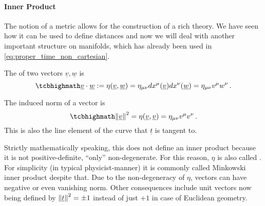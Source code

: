\documentclass[ART_main.tex]{subfiles}
\begin{document}
			\paragraph{Inner Product}
The notion of a metric allows for the construction of a rich theory. We have seen how it can be used to define distances and now we will deal with another important structure on manifolds, which has already been used in \eqref{eq:proper_time_non_cartesian}.

\begin{defi}
The  of two vectors $\underline{v}, \underline{w}$ is
\begin{equation}\label{eq:inner_prod}
	\eqbox{
	\underline{v} \cdot \underline{w} := \eta(\underline{v}, \underline{w}) = \eta_{\mu \nu} dx^\mu(\underline{v}) dx^\nu(\underline{w}) = \eta_{\mu \nu} v^\mu w^\nu
	} \, .
\end{equation}

The induced norm of a vector is
\begin{equation}\label{eq:vector_norm}
	\eqbox{
	\norm{\underline{v}}^2 = \eta(\underline{v}, \underline{v}) = \eta_{\mu \nu} v^\mu v^\nu
	} \, .
\end{equation}
This is also the line element of the curve that $\underline{t}$ is tangent to.
\iffalse
Based on that, a general way to define the distance between events $E_1$ at $\underline{x_1} = (ct_1, x_1, y_1, z_1)$ and $E_2$ at $\underline{x_2} = (ct_2, x_2, y_2, z_2)$ in an inertial Cartesian frame is
\begin{equation}
	\eqbox{
	\begin{split}
	d(E_1, E_2) &= \sqrt{(x_2 - x_1)^2 + (y_2 - y_1)^2 + (z_2 - z_1)^2 - c^2 (t_2 - t_1)^2}
	\\
	&= c \, \sqrt{- \tau_{E_1, E_2}^2} = \eta_{\mu \nu} (x_1^\mu - x_2^\mu) (x_1^\nu - x_2^\nu)
	\\
	&= \min_{\Gamma: \; \Gamma(a) = E_1, \Gamma(b) = E_2} L(\Gamma)
	= \min_{\Gamma: \; \Gamma(a) = E_1, \Gamma(b) = E_2} \int_\Gamma ds
	\end{split}
	}
\end{equation}
i.e.~as the (proper) length of the straight world line connecting them.
\fi
\end{defi}
Strictly mathematically speaking, this does not define an inner product because it is not positive-definite, \enquote{only} non-degenerate. For this reason, $\eta$ is also called . For simplicity (in typical physicist-manner) it is commonly called Minkowski inner product despite that. Due to the non-degeneracy of $\eta$, vectors can have negative or even vanishing norm. Other consequences include unit vectors now being defined by $\norm{\underline{t}}^2 = \pm 1$ instead of just $+ 1$ in case of Euclidean geometry.
\end{document}
